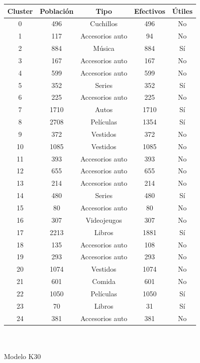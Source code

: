 \begin{tabular}{| c | c | c | c | c |}\hline
Cluster & Población & Tipo & Efectivos & Útiles\\\hline
0 & 496 & Cuchillos & 496 & No\\
1 & 117 & Accesorios auto & 94 & No\\
2 & 884 & Música & 884 & Sí\\
3 & 167 & Accesorios auto & 167 & No\\
4 & 599 & Accesorios auto & 599 & No\\
5 & 352 & Series & 352 & Sí\\
6 & 225 & Accesorios auto & 225 & No\\
7 & 1710 & Autos & 1710 & Sí\\
8 & 2708 & Películas & 1354 & Sí\\
9 & 372 & Vestidos & 372 & No\\
10 & 1085 & Vestidos & 1085 & No\\
11 & 393 & Accesorios auto & 393 & No\\
12 & 655 & Accesorios auto & 655 & No\\
13 & 214 & Accesorios auto & 214 & No\\
14 & 480 & Series & 480 & Sí\\
15 & 80 & Accesorios auto & 80 & No\\
16 & 307 & Videojeugos & 307 & No\\
17 & 2213 & Libros & 1881 & Sí\\
18 & 135 & Accesorios auto & 108 & No\\
19 & 293 & Accesorios auto & 293 & No\\
20 & 1074 & Vestidos & 1074 & No\\
21 & 601 & Comida & 601 & No\\
22 & 1050 & Películas & 1050 & Sí\\
23 & 70 & Libros & 31 & Sí\\
24 & 381 & Accesorios auto & 381 & No\\\hline
\end{tabular}\\
\\
Modelo K30\\
